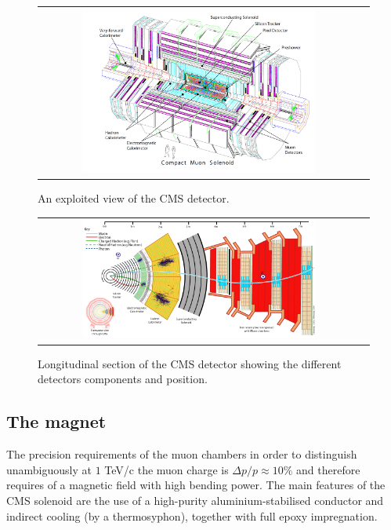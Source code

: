 \begin{figure}[tbh!]
	\centering
	\begin{tabular}{cc}
		\includegraphics[width=0.75\textwidth]{detector/pics/CMS_apparatus.png}
	\end{tabular}
	\caption{An exploited view of the CMS detector.}
	\label{fig:CMS_apparatus}
\end{figure}

\begin{figure}[tbh!]
	\centering
	\begin{tabular}{cc}
		\includegraphics[width=0.75\textwidth]{detector/pics/CMS_slice.png}
	\end{tabular}
	\caption{Longitudinal section of the CMS detector showing the different detectors components and position.}
	\label{fig:CMS_slice}
\end{figure}

\clearpage

\subsection{The magnet}

The precision requirements of the muon chambers in order to distinguish unambiguously at $1$ TeV/c the muon charge is $\Delta p / p \approx 10\%$ and therefore requires of a magnetic field with high bending power. The main features of the CMS solenoid are the use of a high-purity aluminium-stabilised conductor and indirect cooling (by a thermosyphon), together with full epoxy impregnation.

